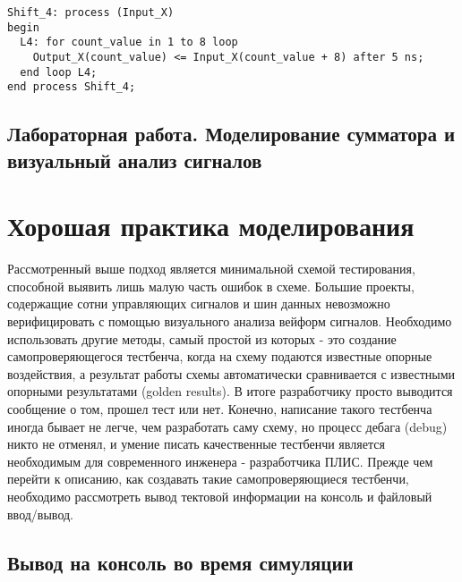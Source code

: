 \begin{Code}
\begin{lstlisting}[caption=Цикл For, label=loop_4]
Shift_4: process (Input_X)
begin
  L4: for count_value in 1 to 8 loop
    Output_X(count_value) <= Input_X(count_value + 8) after 5 ns;
  end loop L4;
end process Shift_4;
\end{lstlisting}
\end{Code}


\subsection{Лабораторная работа. Моделирование сумматора и визуальный анализ сигналов}



\section{Хорошая практика моделирования}

Рассмотренный выше подход является минимальной схемой тестирования, способной выявить лишь малую часть ошибок в схеме. Большие проекты, содержащие сотни управляющих сигналов и шин данных невозможно верифицировать с помощью визуального анализа вейформ сигналов. Необходимо использовать другие методы, самый простой из которых - это создание самопроверяющегося тестбенча, когда на схему подаются известные опорные воздействия, а результат работы схемы автоматически сравнивается с известными опорными результатами (golden results). В итоге разработчику просто выводится сообщение о том, прошел тест или нет. Конечно, написание такого тестбенча иногда бывает не легче, чем разработать саму схему, но процесс дебага (debug) никто не отменял, и умение писать качественные тестбенчи является необходимым для современного инженера - разработчика ПЛИС. Прежде чем перейти к описанию, как создавать такие самопроверяющиеся тестбенчи, необходимо рассмотреть вывод тектовой информации на консоль и файловый ввод/вывод.

\subsection{Вывод на консоль во время симуляции}

